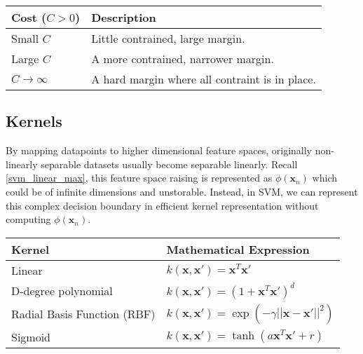 \parbox{\linewidth} {
	\centering
  \begin{tabularx}{\textwidth}{|l|X|}
    \hline
    \textbf{Cost ($C > 0 $)}	  & \textbf{Description}
    \\ \hline
    Small $C$ 							    & Little contrained, large margin. 
    \\ \hline
    Large $C$  	                & A more contrained, narrower margin.
		\\ \hline
    $C \rightarrow \infty$      & A hard margin where all contraint is in place.
    \\ \hline

  \end{tabularx}
	\label{tab:c_vals}
}


\subsection{Kernels}
By mapping datapoints to higher dimensional feature spaces, originally non-linearly separable datasets usually become separable linearly. Recall \autoref{svm_linear_max}, this feature space raising is represented as $\phi \left (\mathbf{x}_n \right)$ which could be of infinite dimensions and unstorable. Instead, in SVM, we can represent this complex decision boundary in efficient kernel representation without computing $\phi \left (\mathbf{x}_n \right)$. 

\parbox{\linewidth} {
  \centering
  \def\arraystretch{1.5}
  \begin{tabularx}{\textwidth}{|X|X|}
    \hline
    \textbf{Kernel}     & \textbf{Mathematical Expression}
    \\ \hline
    Linear              & $k(\mathbf{x},\mathbf{x'}) = \mathbf{x}^T\mathbf{x'}$
    \\ \hline
    D-degree polynomial & $k(\mathbf{x},\mathbf{x'}) = \left(1+\mathbf{x}^T\mathbf{x'}\right)^d$ 
    \\ \hline
    Radial Basis Function (RBF) & $k(\mathbf{x},\mathbf{x'}) = \exp \left( -\gamma ||\mathbf{x}-\mathbf{x'}||^2 \right)$
		\\ \hline
    Sigmoid             & $k(\mathbf{x},\mathbf{x'}) = \tanh \left(a\mathbf{x}^T\mathbf{x'} + r\right)$
    \\ \hline
  \end{tabularx} 
  \label{tab:kernel_vals}
}

